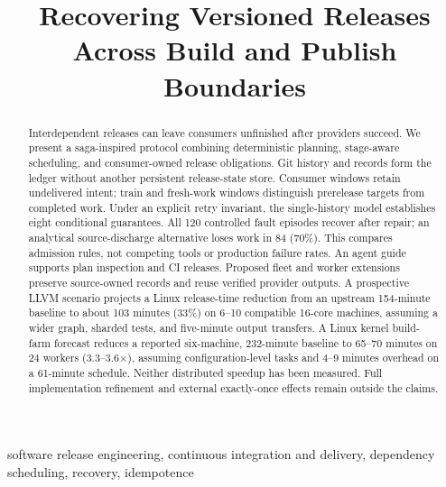 \documentclass[10pt,conference]{IEEEtran}
\theoremstyle{definition}
\begin{document}
\title{Recovering Versioned Releases Across Build and Publish Boundaries}
\maketitle
\begin{abstract}
Interdependent releases can leave consumers unfinished after providers succeed.
We present a saga-inspired protocol combining deterministic planning,
stage-aware scheduling, and consumer-owned release obligations. Git history and
records form the ledger without another persistent release-state store.
Consumer windows retain undelivered intent; train and fresh-work windows
distinguish prerelease targets from completed work. Under an explicit retry
invariant, the single-history model establishes eight conditional guarantees.
All 120 controlled
fault episodes recover after repair; an analytical source-discharge alternative
loses work in 84 (70\%). This compares admission rules, not competing
tools or production failure rates. An agent guide supports plan
inspection and CI releases. Proposed fleet and worker extensions
preserve source-owned records and reuse verified provider outputs. A prospective
LLVM scenario projects a Linux release-time reduction from an upstream
154-minute baseline to about 103 minutes (33\%) on 6--10 compatible 16-core
machines, assuming a wider graph, sharded tests, and five-minute output transfers.
A Linux kernel build-farm forecast reduces a reported six-machine, 232-minute
baseline to 65--70 minutes on 24 workers (3.3--3.6$\times$), assuming
configuration-level tasks and 4--9 minutes overhead on a 61-minute schedule.
Neither distributed speedup has been measured. Full implementation refinement and
external exactly-once effects remain outside the claims.
\end{abstract}
\begin{IEEEkeywords}
software release engineering, continuous integration and delivery,
dependency scheduling, recovery, idempotence
\end{IEEEkeywords}






\clearpage
{}

\end{document}
